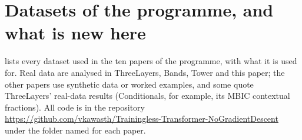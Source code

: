 \documentclass[11pt]{article}
\theoremstyle{definition}
\theoremstyle{remark}
\begin{document}
\section{Datasets of the programme, and what is new here}\label{sec:datasets}

 lists every dataset used in the ten papers of the programme, with what it is used for. Real data are analysed in
ThreeLayers, Bands, Tower and this paper; the other papers use synthetic data or worked examples, and some quote ThreeLayers' real-data
results (Conditionals, for example, its MBIC contextual fractions). All code is in the repository
\url{https://github.com/vkawasth/Trainingless-Transformer-NoGradientDescent} under the folder named for each paper.
\end{document}
